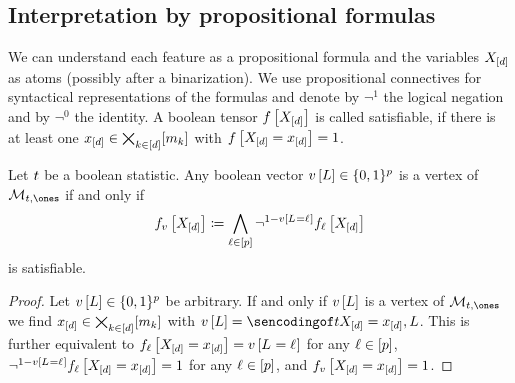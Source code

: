 \subsection{Interpretation by propositional formulas}

We can understand each feature as a propositional formula and the variables $X_{[d]}$ as atoms (possibly after a binarization).
We use propositional connectives for syntactical representations of the formulas and denote by $\lnot^{1}$ the logical negation and by $\lnot^{0}$ the identity.
A boolean tensor $f\left[X_{[d]}\right]$ is called satisfiable, if there is at least one $x_{[d]}\in\bigtimes_{k\in[d]}[m_{k}]$ with $f\left[X_{[d]}=x_{[d]}\right]=1$.


\begin{theorem}\label{the:boolVecSat}
    Let $t$ be a boolean statistic.
    Any boolean vector $v\left[L\right]\in\{0,1\}^{p}$ is a vertex of $\hlnmeanset$ if and only if
    \begin{align*}
        f_{v}\left[X_{[d]}\right]
        \coloneqq \bigwedge_{\ell\in[p]} \lnot^{1-v\left[L_{}=\ell_{}\right]} f_{\ell}\left[X_{[d]}\right]
    \end{align*}
    is satisfiable.
\end{theorem}
\begin{proof}
    Let $v\left[L\right]\in\{0,1\}^{p}$ be arbitrary.
    If and only if $v\left[L\right]$ is a vertex of $\hlnmeanset$ we find $x_{[d]}\in\bigtimes_{k\in[d]}[m_{k}]$ with $\imelementwith=\sencsstat{\indexedshortcatvariables,\selvariable}$.
    This is further equivalent to $f_{\ell}\left[X_{[d]}=x_{[d]}\right]=v\left[L_{}=\ell_{}\right]$ for any $\ell\in[p]$, $\lnot^{1-v\left[L_{}=\ell_{}\right]}f_{\ell}\left[X_{[d]}=x_{[d]}\right]=1$ for any $\ell\in[p]$, and $f_{v}\left[X_{[d]}=x_{[d]}\right]=1$.
\end{proof}

